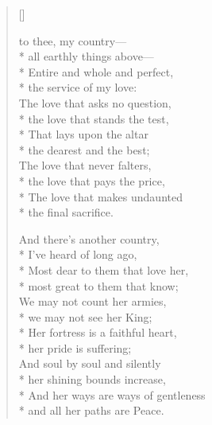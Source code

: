 \newHymn
{}
\begin{verse}[\versewidth]
\begin{altverse}
 to thee, my country---\\*
all earthly things above---\\*
Entire and whole and perfect,\\*
the service of my love:\\
The love that asks no question,\\*
the love that stands the test,\\*
That lays upon the altar\\*
the dearest and the best;\\
The love that never falters,\\*
the love that pays the price,\\*
The love that makes undaunted\\*
the final sacrifice.
\end{altverse}

\begin{altverse}
 And there's another country,\\*
I've heard of long ago,\\*
Most dear to them that love her,\\*
 most great to them that know;\\
We may not count her armies,\\*
 we may not see her King;\\*
Her fortress is a faithful heart,\\*
 her pride is suffering;\\
And soul by soul and silently\\*
 her shining bounds increase,\\*
And her ways are ways of gentleness\\*
 and all her paths are Peace.
\end{altverse}

\end{verse}


